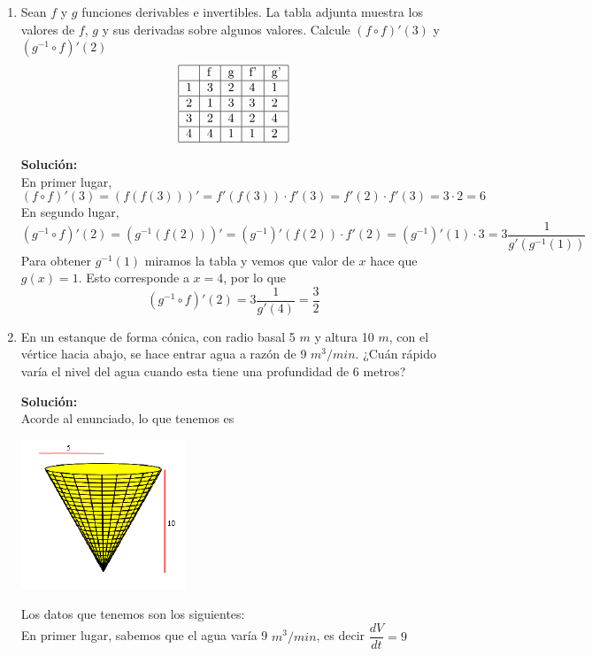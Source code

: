 \documentclass[12pt]{article}
\newenvironment{solucion}
{\begin{mdframed}[backgroundcolor=black!10]
		{\bf Solución:}\\
	}
	{
	\end{mdframed}
}
\newenvironment{preguntas}
{\begin{enumerate}\itemsep12pt
	}
	{
	\end{enumerate}
}
\newcommand{\ra}{\rightarrow}
\begin{document}
\begin{preguntas}
\begin{solucion}
Entonces, 
$$(f^{-1})'(6) = \dfrac{1}{f'(0)}$$
Derivando,
$$f'(x) = 3x^2+3 \ra f'(0) = 3$$
Finalmente,
$$(f^{-1})'(6) = \dfrac{1}{3}$$
\end{solucion}
\item Sean $f$ y $g$ funciones derivables e invertibles. La tabla adjunta muestra los valores de $f$, $g$ y sus derivadas sobre algunos valores. Calcule $(f \circ f)'(3)$ y $(g^{-1} \circ f)'(2)$
$$
\begin{tabular}{|l|l|l|l|l|}
\hline
  & f & g & f' & g' \\ \hline
1 & 3 & 2 & 4  & 1  \\ \hline
2 & 1 & 3 & 3  & 2  \\ \hline
3 & 2 & 4 & 2  & 4  \\ \hline
4 & 4 & 1 & 1  & 2  \\ \hline
\end{tabular}
$$
\begin{solucion}
En primer lugar,
$$(f \circ f)'(3) = (f(f(3)))' = f'(f(3))\cdot f'(3) = f'(2) \cdot f'(3) = 3 \cdot 2 = 6$$
En segundo lugar,	
$$(g^{-1} \circ f)'(2) = (g^{-1}(f(2)))' = (g^{-1})'(f(2)) \cdot f'(2) = (g^{-1})'(1)\cdot 3 = 3\dfrac{1}{g'(g^{-1}(1))}$$
Para obtener $g^{-1}(1)$ miramos la tabla y vemos que valor de $x$ hace que $g(x) = 1$. Esto corresponde a $x=4$, por lo que
$$(g^{-1} \circ f)'(2) = 3\dfrac{1}{g'(4)} = \dfrac{3}{2}$$
\end{solucion}
\item En un estanque de forma cónica, con radio basal 5 $m$ y altura 10 $m$, con el vértice hacia abajo, se hace entrar agua a razón de 9 $m^3/min$. ¿Cuán rápido varía el nivel del agua cuando esta tiene una profundidad de 6 metros?
\begin{solucion}
Acorde al enunciado, lo que tenemos es
\begin{center}
\includegraphics[]{cono.PNG}
\end{center}
Los datos que tenemos son los siguientes:\\
En primer lugar, sabemos que el agua varía 9 $m^3/min$, es decir $\dfrac{dV}{dt} = 9$\\

\end{solucion}
\end{preguntas}
\end{document}
